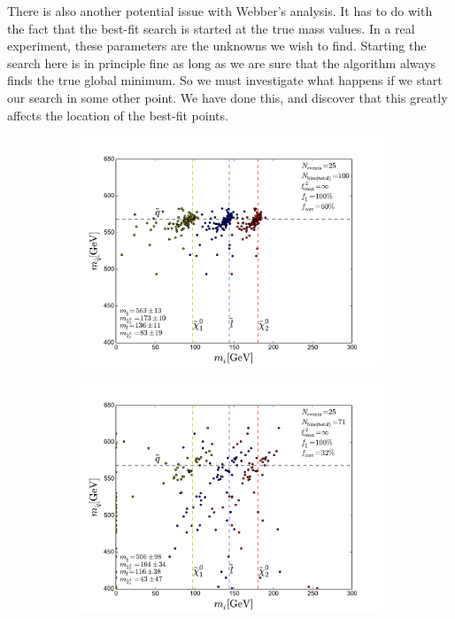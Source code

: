 \documentclass[twoside,english]{uiofysmaster}
\begin{document}
There is also another potential issue with Webber's analysis. It has to do with the fact that the best-fit search is started at the true mass values.  In a real experiment, these parameters are the unknowns we wish to find. Starting the search here is in principle fine as long as we are sure that the algorithm always finds the true global minimum. So we must investigate what happens if we start our search in some other point. We have done this, and discover that this greatly affects the location of the best-fit points.
\begin{figure}[hbt]
	\centering
	\begin{subfigure}[b]{0.45\textwidth}
		\includegraphics[width=\textwidth]{figures/webber_rec_table/webber_HW-rec_nocut.pdf} 
		\caption{ }
	\end{subfigure}
	\begin{subfigure}[b]{0.45\textwidth}
		\includegraphics[width=\textwidth]{figures/webber_rec_table/webber-rec_wrong_starting_point-400-300-200-100_lowtol.pdf}
		\caption{ } 
	\end{subfigure}


\end{figure}
\end{document}
